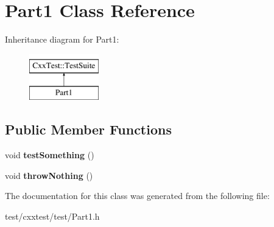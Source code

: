 \hypertarget{classPart1}{\section{Part1 Class Reference}
\label{classPart1}
}
Inheritance diagram for Part1\-:\begin{figure}[H]
\begin{center}
\leavevmode
\includegraphics[height=2.000000cm]{classPart1}
\end{center}
\end{figure}
\subsection*{Public Member Functions}
\begin{DoxyCompactItemize}
\item 
\hypertarget{classPart1_a43f2ed3ca0cfccfeef7b9b02aee9a398}{void {\bfseries test\-Something} ()}\label{classPart1_a43f2ed3ca0cfccfeef7b9b02aee9a398}

\item 
\hypertarget{classPart1_ab0e130f908baab66cf0aac394b025009}{void {\bfseries throw\-Nothing} ()}\label{classPart1_ab0e130f908baab66cf0aac394b025009}

\end{DoxyCompactItemize}


The documentation for this class was generated from the following file\-:\begin{DoxyCompactItemize}
\item 
test/cxxtest/test/Part1.\-h\end{DoxyCompactItemize}
